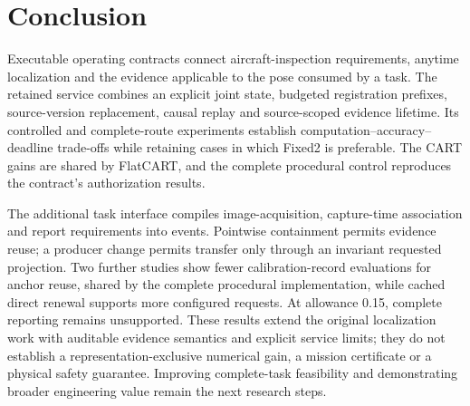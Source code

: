 \section{Conclusion}
Executable operating contracts connect aircraft-inspection requirements, anytime localization and the evidence applicable to the pose consumed by a task. The retained service combines an explicit joint state, budgeted registration prefixes, source-version replacement, causal replay and source-scoped evidence lifetime. Its controlled and complete-route experiments establish computation--accuracy--deadline trade-offs while retaining cases in which Fixed2 is preferable. The CART gains are shared by FlatCART, and the complete procedural control reproduces the contract's authorization results.

The additional task interface compiles image-acquisition, capture-time association and report requirements into events. Pointwise containment permits evidence reuse; a producer change permits transfer only through an invariant requested projection. Two further studies show fewer calibration-record evaluations for anchor reuse, shared by the complete procedural implementation, while cached direct renewal supports more configured requests. At allowance 0.15, complete reporting remains unsupported. These results extend the original localization work with auditable evidence semantics and explicit service limits; they do not establish a representation-exclusive numerical gain, a mission certificate or a physical safety guarantee. Improving complete-task feasibility and demonstrating broader engineering value remain the next research steps.
